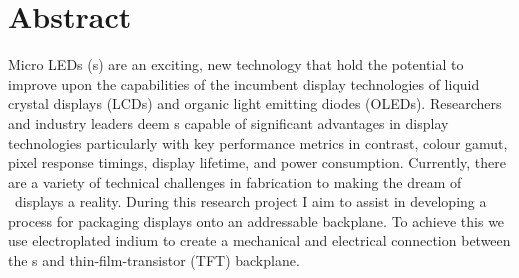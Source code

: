 \chapter*{Abstract}
Micro LEDs (\uled s) are an exciting, new technology that hold the potential to improve upon the capabilities of the incumbent display technologies of liquid crystal displays (LCDs) and organic light emitting diodes (OLEDs). Researchers and industry leaders deem \uled s capable of significant advantages in display technologies particularly with key performance metrics in contrast, colour gamut, pixel response timings, display lifetime, and power consumption.
Currently, there are a variety of technical challenges in fabrication to making the dream of \uled \ displays a reality. During this research project I aim to assist in developing a process for packaging \uled  displays onto an addressable backplane.
To achieve this we use electroplated indium to create a mechanical and electrical connection between the \uled s and thin-film-transistor (TFT) backplane.
